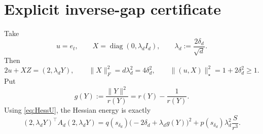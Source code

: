 \documentclass[11pt]{article}
\numberwithin{equation}{section}
\DeclareMathOperator{\diag}{diag}
\begin{document}
\section{Explicit inverse-gap certificate}

Take
\begin{equation}\label{eq:witness}
  u=e_t,
  \qquad
  X=\diag(0,\lambda_d I_d),
  \qquad
  \lambda_d:=\frac{2\delta_d}{\sqrt d}.
\end{equation}
Then
\begin{equation}\label{eq:b-and-X}
  2u+XZ=(2,\lambda_dY),
  \qquad
  \lVert X\rVert_F^2=d\lambda_d^2=4\delta_d^2,
  \qquad
  \lVert(u,X)\rVert_\star^2=1+2\delta_d^2\ge1.
\end{equation}
Put
\begin{equation}\label{eq:gdef}
  g(Y):=\frac{\lVert Y\rVert^2}{r(Y)}=r(Y)-\frac1{r(Y)}.
\end{equation}
Using \eqref{eq:HessU}, the Hessian energy is exactly
\begin{equation}\label{eq:exact-A-energy}
  (2,\lambda_dY)^\top A_d(2,\lambda_dY)
  =q(s_{\delta_d})\bigl(-2\delta_d+\lambda_dg(Y)\bigr)^2
   +p(s_{\delta_d})\lambda_d^2\frac{S}{r^3}.
\end{equation}
\end{document}
